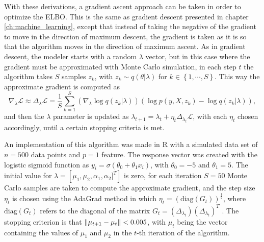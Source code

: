 With these derivations, a gradient ascent approach can be taken in order to optimize the ELBO. This is the same as gradient descent presented in chapter \ref{ch:machine_learning}, except that instead of taking the negative of the gradient to move in the direction of maximum descent, the gradient is taken as it is so that the algorithm moves in the direction of maximum ascent. As in gradient descent, the modeler starts with a random $\lambda$ vector, but in this case where the gradient must be approximated with Monte Carlo simulation, in each step $t$ the algorithm takes $S$ samples $z_k$, with $z_k \sim q(\theta | \lambda)$ for $k \in \left\{1, \cdots, S \right\}$. This way the approximate gradient is computed as
\begin{equation}
  \nabla_{\lambda} \mathcal{L} \approx \Delta_{\lambda} \mathcal{L} = \frac{1}{S} \sum_{k = 1}^S \left( \nabla_{\lambda} \log q(z_k | \lambda) \right) \left( \log p(y, X, z_k) - \log q(z_k | \lambda) \right),
\end{equation}
and then the $\lambda$ parameter is updated as $\lambda_{t+1} = \lambda_{t} + \eta_t  \Delta_{\lambda_t} \mathcal{L}$, with each $\eta_t$ chosen accordingly, until a certain stopping criteria is met.

An implementation of this algorithm was made in R with a simulated data set of $n = 500$ data points and $p = 1$ feature. The response vector was created with the logistic sigmoid function as $y_i = \sigma(\theta_0 + \theta_1 x_i)$, with $\theta_0 = -5$ and $\theta_1 = 5$. The initial value for $\lambda = \left[ \mu_1, \mu_2, \alpha_1, \alpha_2 ]^T \right]$ is zero, for each iteration $S = 50$ Monte Carlo samples are taken to compute the approximate gradient, and the step size $\eta_t$ is chosen using the AdaGrad method in which
$\eta_t = \left( \mathrm{diag}(G_t) \right)^{\frac{1}{2}}$, where $\mathrm{diag}(G_t)$ refers to the diagonal of the matrix $G_t = \left( \Delta_{\lambda_t} \right) \left( \Delta_{\lambda_t} \right)^T$ \cite{duchi2011adaptive}. The stopping criterion is that
$\left\lVert \mu_{t+1} - \mu_{t} \right\rVert < 0.005$,
with $\mu_t$ being the vector containing the values of $\mu_1$ and $\mu_2$ in the $t$-th iteration of the algorithm.

